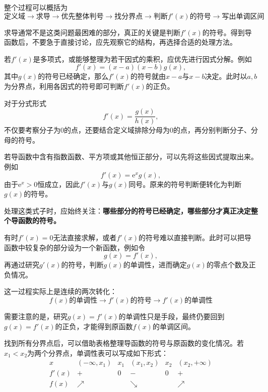 整个过程可以概括为
\[
\boxed{
\text{定义域}
\longrightarrow
\text{求导}
\longrightarrow
\text{优先整体判号}
\longrightarrow
\text{找分界点}
\longrightarrow
\text{判断$f'(x)$的符号}
\longrightarrow
\text{写出单调区间}
}
\]

\medskip
{}

求导通常不是这类问题最困难的部分，真正的关键是判断$f'(x)$的符号。得到导函数后，不要急于直接讨论，应先观察它的结构，再选择合适的处理方法。

\medskip
{}

若$f'(x)$是多项式，或能够整理为若干因式的乘积，应优先进行因式分解。例如
\[
f'(x)=(x-a)(x-b)g(x),
\]
其中$g(x)$的符号已经确定，那么$f'(x)$的符号就由$x-a$与$x-b$决定。此时以$a,b$为分界点，利用各因式的符号即可判断$f'(x)$的正负。

对于分式形式
\[
f'(x)=\frac{g(x)}{h(x)},
\]
不仅要考察分子为$0$的点，还要结合定义域排除分母为$0$的点，再分别判断分子、分母的符号。

\medskip
{}

若导函数中含有指数函数、平方项或其他恒正部分，可以先将这些因式提取出来。例如
\[
f'(x)=\mathrm{e}^x g(x),
\]
由于$\mathrm{e}^x>0$恒成立，因此$f'(x)$与$g(x)$同号。原来的符号判断便转化为判断$g(x)$的符号。

处理这类式子时，应始终关注：\textbf{哪些部分的符号已经确定，哪些部分才真正决定整个导函数的符号。}

\medskip
{}

有时$f'(x)=0$无法直接求解，或者$f'(x)$的符号难以直接判断。此时可以把导函数中较复杂的部分设为一个新函数，例如令
\[
g(x)=f'(x),
\]
再通过研究$g'(x)$的符号，判断$g(x)$的单调性，进而确定$g(x)$的零点个数及正负情况。

这一过程实际上是连续的两次转化：
\[
\boxed{
\text{$f(x)$的单调性}
\longrightarrow
\text{$f'(x)$的符号}
\longrightarrow
\text{$f'(x)$的单调性}
}
\]

需要注意的是，研究$g(x)=f'(x)$的单调性只是手段，最终仍要回到$g(x)=f'(x)$的正负，才能得到原函数$f(x)$的单调区间。

\medskip
{}

找到所有分界点后，可以借助表格整理导函数的符号与原函数的变化情况。若$x_1<x_2$为两个分界点，单调性表可以写成如下形式：
\[
\begin{array}{c|ccccccc}
x      & (-\infty,x_1) & x_1 & (x_1,x_2) & x_2 & (x_2,+\infty) \\ \hline
f'(x)  & +              & 0   & -           & 0   & +               \\ \hline
f(x)   & \nearrow       &     & \searrow    &     & \nearrow
\end{array}
\]

